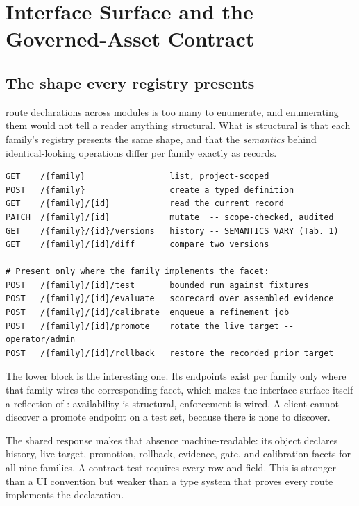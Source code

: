 \section{Interface Surface and the Governed-Asset Contract}
\label{app:api}

\subsection{The shape every registry presents}

\statRouteDecls{} route declarations across \statRouteModules{} modules is too many
to enumerate, and enumerating them would not tell a reader anything structural. What
is structural is that each family's registry presents the same shape, and that the
\emph{semantics} behind identical-looking operations differ per family exactly as
 records.

\begin{lstlisting}[caption={The shape shared by every family's registry surface.
Identical operation names; per-family semantics. The comments mark where
\tabref{tab:families} is the authority.},label={lst:contract},
captionpos=b,language={}]
GET    /{family}                 list, project-scoped
POST   /{family}                 create a typed definition
GET    /{family}/{id}            read the current record
PATCH  /{family}/{id}            mutate  -- scope-checked, audited
GET    /{family}/{id}/versions   history -- SEMANTICS VARY (Tab. 1)
GET    /{family}/{id}/diff       compare two versions

# Present only where the family implements the facet:
POST   /{family}/{id}/test       bounded run against fixtures
POST   /{family}/{id}/evaluate   scorecard over assembled evidence
POST   /{family}/{id}/calibrate  enqueue a refinement job
POST   /{family}/{id}/promote    rotate the live target -- operator/admin
POST   /{family}/{id}/rollback   restore the recorded prior target
\end{lstlisting}

The lower block is the interesting one. Its endpoints exist per family only where
that family wires the corresponding facet, which makes the interface surface itself
a reflection of : availability is structural, enforcement is
wired. A client cannot discover a promote endpoint on a test set, because there is
none to discover.

The shared  response makes that absence machine-readable:
its  object declares history, live-target, promotion,
rollback, evidence, gate, and calibration facets for all nine families. A contract
test requires every row and field. This is stronger than a UI convention but weaker
than a type system that proves every route implements the declaration.

